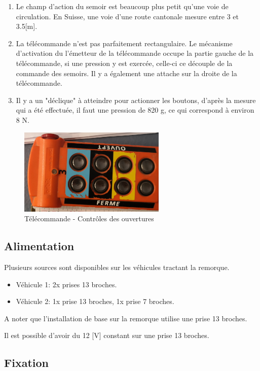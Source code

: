 \begin{enumerate}
    \item{Le champ d'action du semoir est beaucoup plus petit qu'une voie de circulation. En Suisse, une voie d'une route cantonale mesure entre 3 et 3.5[m].}
    \item{La télécommande n'est pas parfaitement rectangulaire. Le mécanisme d'activation du l'émetteur de la télécommande occupe la partie gauche de la télécommande,
                si une pression y est exercée, celle-ci ce découple de la commande des semoirs. Il y a également une attache sur la droite de la télécommande.}
    \item{Il y a un "déclique" à atteindre pour actionner les boutons, d'après la mesure qui a été effectuée, il faut une pression de 820 \si{\gram}, ce qui correspond à environ 8 \si{\newton}}.
\end{enumerate}

\begin{figure}[H]
    \centering
    \includegraphics[width=7cm]{assets/figures/telecommande2.jpg}
    \caption{Télécommande - Contrôles des ouvertures}
\end{figure}

\subsection{Alimentation}
Plusieurs sources sont disponibles sur les véhicules tractant la remorque.
\begin{itemize}
    \item{Véhicule 1: 2x prises 13 broches.}
    \item{Véhicule 2: 1x prise 13 broches, 1x prise 7 broches.}
\end{itemize}
A noter que l'installation de base sur la remorque utilise une prise 13 broches.

Il est possible d'avoir du 12 [V] constant sur une prise 13 broches.
\newpage
\subsection{Fixation}
